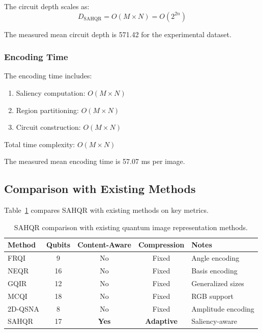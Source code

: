 \documentclass[pdflatex,sn-mathphys-num,Numbered]{sn-jnl}
\theoremstyle{thmstyleone}
\theoremstyle{thmstyletwo}
\theoremstyle{thmstylethree}
\begin{document}
The circuit depth scales as:
\begin{equation}
D_{\text{SAHQR}} = O(M \times N) = O(2^{2n})
\label{eq:sahqr_depth}
\end{equation}

The measured mean circuit depth is 571.42 for the experimental dataset.

\subsubsection{Encoding Time}

The encoding time includes:
\begin{enumerate}
\item Saliency computation: $O(M \times N)$
\item Region partitioning: $O(M \times N)$
\item Circuit construction: $O(M \times N)$
\end{enumerate}

Total time complexity: $O(M \times N)$

The measured mean encoding time is 57.07 ms per image.

\subsection{Comparison with Existing Methods}

Table~\ref{tab:sahqr_comparison} compares SAHQR with existing methods on key metrics.

\begin{table}[h!]
\caption{SAHQR comparison with existing quantum image representation methods.}
\label{tab:sahqr_comparison}
\centering
\begin{tabular}{@{}lcccl@{}}
\toprule
Method & Qubits & Content-Aware & Compression & Notes \\
\midrule
FRQI & 9 & No & Fixed & Angle encoding \\
NEQR & 16 & No & Fixed & Basis encoding \\
GQIR & 12 & No & Fixed & Generalized sizes \\
MCQI & 18 & No & Fixed & RGB support \\
2D-QSNA & 8 & No & Fixed & Amplitude encoding \\
SAHQR & 17 & \textbf{Yes} & \textbf{Adaptive} & Saliency-aware \\
\bottomrule
\end{tabular}
\end{table}
\end{document}
